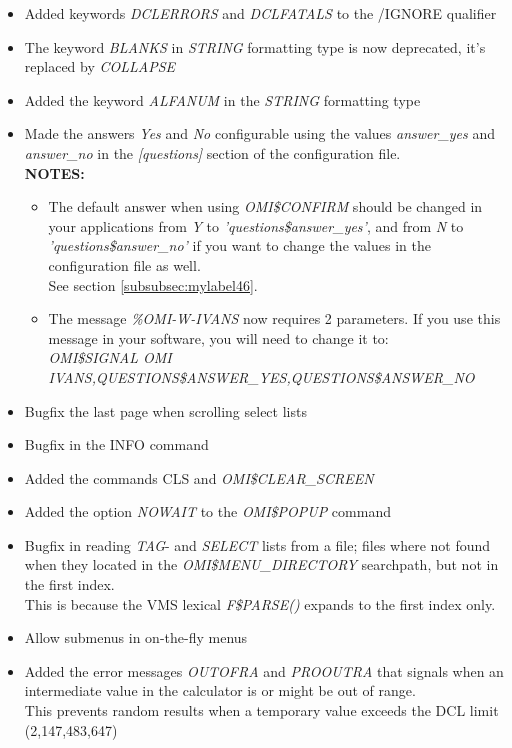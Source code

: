 \documentclass[a4paper]{book}
\begin{document}
\begin{itemize}
\item Added keywords \textsl{DCLERRORS} and \textsl{DCLFATALS} to the \textsf{/IGNORE} qualifier
\item The keyword \textsl{BLANKS} in \textsl{STRING} formatting type is now deprecated, it's replaced by \textsl{COLLAPSE}
\item Added the keyword \textsl{ALFANUM} in the \textsl{STRING} formatting type
\item Made the answers \textsl{Yes} and \textsl{No} configurable using the values \textsl{answer{\_}yes} and \textsl{answer{\_}no} in the \textsl{[questions]} section of the configuration file.\\
\textbf{NOTES:}
\begin{itemize}
\item The default answer when using \textsl{OMI{\$}CONFIRM} should be changed in your applications from \textsl{Y} to \textsl{'questions{\$}answer{\_}yes'}, and from \textsl{N} to \textsl{'questions{\$}answer{\_}no'} if you want to change the values in the configuration file as well.\\
See section \ref{subsubsec:mylabel46}.
\item The message \textsl{\%OMI-W-IVANS} now requires 2 parameters. If you use this message in your software, you will need to change it to:\\
\textsl{OMI{\$}SIGNAL OMI IVANS,QUESTIONS{\$}ANSWER{\_}YES,QUESTIONS{\$}ANSWER{\_}NO}
\end{itemize}
\item Bugfix the last page when scrolling select lists
\item Bugfix in the \textsf{INFO} command
\item Added the commands \textsf{CLS} and \textsl{OMI{\$}CLEAR{\_}SCREEN}
\item Added the option \textsl{NOWAIT} to the \textsl{OMI{\$}POPUP} command
\item Bugfix in reading \textsl{TAG}- and \textsl{SELECT} lists from a file; files where not found when they located in the \textsl{OMI{\$}MENU{\_}DIRECTORY} searchpath, but not in the first index.\\
This is because the VMS lexical \textsl{F{\$}PARSE()} expands to the first index only.
\item Allow submenus in on-the-fly menus
\item Added the error messages \textsl{OUTOFRA} and \textsl{PROOUTRA} that signals when an intermediate value in the calculator is or might be out of range.\\
This prevents random results when a temporary value exceeds the DCL limit (2,147,483,647)
\end{itemize}
\end{document}

